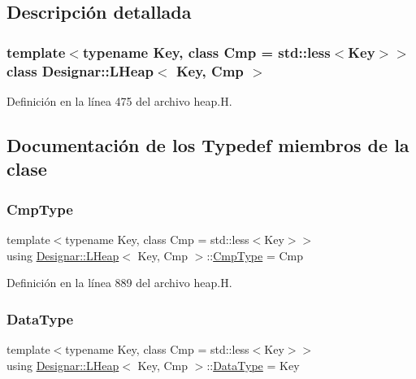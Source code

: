 \subsection{Descripción detallada}
\subsubsection*{template$<$typename Key, class Cmp = std\+::less$<$\+Key$>$$>$\newline
class Designar\+::\+L\+Heap$<$ Key, Cmp $>$}



Definición en la línea 475 del archivo heap.\+H.



\subsection{Documentación de los \textquotesingle{}Typedef\textquotesingle{} miembros de la clase}
\mbox{\label{class_designar_1_1_l_heap_abb2b4f1228557317e5c3188771aea09c}} 
\subsubsection{\texorpdfstring{Cmp\+Type}{CmpType}}
{\footnotesize\ttfamily template$<$typename Key, class Cmp = std\+::less$<$\+Key$>$$>$ \\
using \hyperlink{class_designar_1_1_l_heap}{Designar\+::\+L\+Heap}$<$ Key, Cmp $>$\+::\hyperlink{class_designar_1_1_l_heap_abb2b4f1228557317e5c3188771aea09c}{Cmp\+Type} =  Cmp}



Definición en la línea 889 del archivo heap.\+H.

\mbox{\label{class_designar_1_1_l_heap_abacf82fc0de24e3d5954b075e3fb74b5}} 
\subsubsection{\texorpdfstring{Data\+Type}{DataType}}
{\footnotesize\ttfamily template$<$typename Key, class Cmp = std\+::less$<$\+Key$>$$>$ \\
using \hyperlink{class_designar_1_1_l_heap}{Designar\+::\+L\+Heap}$<$ Key, Cmp $>$\+::\hyperlink{class_designar_1_1_l_heap_abacf82fc0de24e3d5954b075e3fb74b5}{Data\+Type} =  Key}



